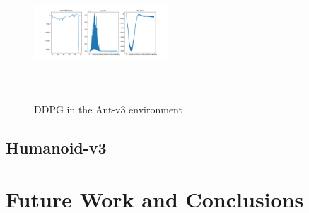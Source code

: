 \documentclass[conference]{IEEEtran}
\begin{document}
\begin{figure}
    \includegraphics[width=0.45\textwidth, height=5cm]{ddpg-ant}
    \caption{DDPG in the Ant-v3 environment}
\end{figure}

\blindtext

\subsection{Humanoid-v3}

\blindtext

\section{Future Work and Conclusions}

\blindtext[2]




\end{document}
